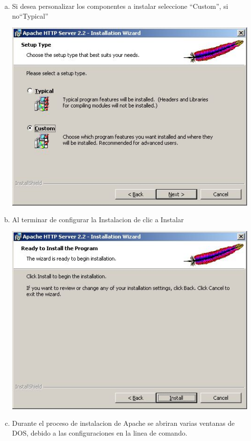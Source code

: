 \documentclass[11pt]{article} %
\begin{document}
\begin{enumerate}
\begin{enumerate}[a)]
\begin{center}
\end{center}
\item Si desea personalizar los componentes a instalar seleccione ``Custom'', si no``Typical''
\begin{center}
\includegraphics[scale=0.7]{Imagenes/Apache03.jpg}
\end{center}
\item Al terminar de configurar la Instalacion de clic a Instalar
\begin{center}
\includegraphics[scale=0.7]{Imagenes/Apache04.jpg}
\end{center}
\item Durante el proceso de instalacion de Apache se abriran varias ventanas de DOS, debido a las configuraciones en la linea de comando.

\end{enumerate}
\end{enumerate}
\end{document}
